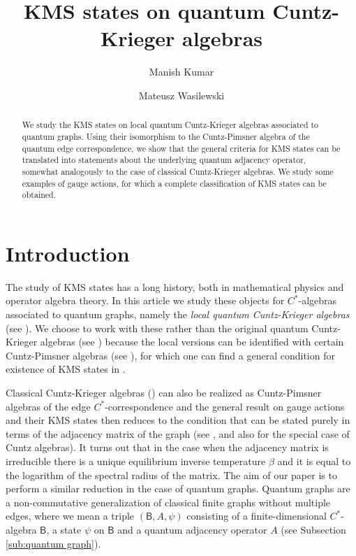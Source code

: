 \documentclass[a4paper,reqno]{amsart}
\numberwithin{equation}{section}
\numberwithin{theorem}{section}
\theoremstyle{definition}\newtheorem{definition}[theorem]{Definition}
\theoremstyle{definition}\newtheorem{remark}[theorem]{Remark}
\theoremstyle{definition}\newtheorem{example}[theorem]{Example}
\theoremstyle{definition}\newtheorem*{notation*}{Notation}
\theoremstyle{definition}\newtheorem*{convention*}{Convention}
\theoremstyle{definition}\newtheorem{observation}{Observation}
\theoremstyle{definition}\newtheorem*{acknowledgment*}{Acknowledgments}
\newcommand{\B}{\mathsf{B}}
\newcommand{\cst}{C^*}
\begin{document}
\title{KMS states on quantum Cuntz-Krieger algebras}

\begin{abstract}
We study the KMS states on local quantum Cuntz-Krieger algebras associated to  quantum graphs. Using their isomorphism to the Cuntz-Pimsner algebra of the quantum edge correspondence,  we show that the general criteria for KMS states can be translated into statements about the underlying quantum adjacency operator, somewhat analogously to the case of classical Cuntz-Krieger algebras. We study some examples of gauge actions, for which a complete classification of KMS states can be obtained.    
\end{abstract}

\author[M.\,Kumar]{Manish Kumar}
\address{KU Leuven, Department of Mathematics, Celestijnenlaan 200B, 3001 Leuven, Belgium}




\author[M.\,Wasilewski]{Mateusz Wasilewski}
\address{Institute of Mathematics of the Polish Academy of Sciences,
	ul.~\'Sniadeckich 8, 00--656
 Warsaw, Poland}

 


\maketitle
\section{Introduction}
The study of KMS states has a long history, both in mathematical physics and operator algebra theory. In this article we study these objects for $C^{\ast}$-algebras associated to quantum graphs, namely the \emph{local quantum Cuntz-Krieger algebras} (see \cite{BHINW}).  We choose to work with these rather than the original quantum Cuntz-Krieger algebras (see \cite{BEVW}) because the local versions can be identified with certain Cuntz-Pimsner algebras (see \cite{Pim}), for which one can find a general condition for existence of KMS states in \cite{LN}.

Classical Cuntz-Krieger algebras (\cite{CK}) can also be realized as Cuntz-Pimsner algebras of the edge $\cst$-correspondence  and the general result on gauge actions and their KMS states then reduces to the condition that can be stated purely in terms of the adjacency matrix of the graph (see \cite{EFW}, and also \cite{OP} for the special case of Cuntz algebras). It turns out that in the  case when the adjacency matrix is irreducible there is a unique equilibrium inverse temperature $\beta$ and it is equal to the logarithm of the spectral radius of the  matrix. The aim of our paper is to perform a similar reduction in the case of quantum graphs. Quantum graphs are a non-commutative generalization of classical finite graphs without multiple edges, where we mean a triple  $(\B, A, \psi)$  consisting of a finite-dimensional $\cst$-algebra $\B$, a state $\psi$ on $\B$ and a quantum adjacency operator $A$ (see Subsection \ref{sub:quantum graph}).
\end{document}
